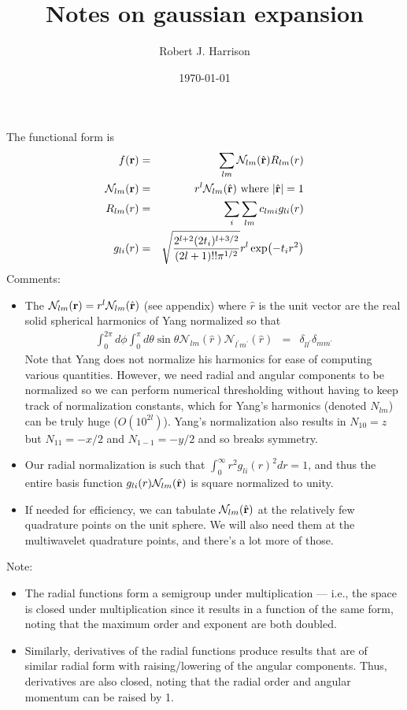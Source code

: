 \documentclass[12pt]{article}
\title{Notes on gaussian expansion}
\date{\today}
\author{Robert J. Harrison}
\newcommand{\N}{\mathcal{N}}
\begin{document}
\maketitle

The functional form is
\begin{eqnarray}
  f(\vb{r}) & = & \sum_{l m} \N_{lm}(\hat{\vb{r}}) R_{lm}(r) \\
  \N_{lm}(\vb{r}) & = &  r^l \N_{lm}(\hat{\vb{r}}) ~ \mbox{where} ~ |\hat{\vb{r}}| = 1 \\
  R_{lm}(r) & = & \sum_i \sum_{l m} c_{lmi} g_{li}(r) \\
  g_{li}(r) & = & \sqrt{\frac{2^{l + 2} (2t_i)^{l + 3/2}}{(2 l + 1)!! \pi^{1/2}}} r^l \exp(-t_i r^2) 
\end{eqnarray}
Comments:
\begin{itemize}
\item The $\N_{lm}(\vb{r}) = r^l \N_{lm}(\hat{\vb{r}})$ (see appendix) where $\hat{r}$ is the unit vector are the real solid spherical harmonics of Yang normalized so that
\begin{eqnarray}
  \int_0^{2 \pi} d\phi \int_0^\pi d\theta \sin \theta  \N_{lm} (\hat{r}) \N_{l^\prime m^\prime}(\hat{r})  & = & \delta_{l l^\prime} \delta_{m m^\prime}
\end{eqnarray}
Note that Yang does not normalize his harmonics for ease of computing various quantities.  However, we need radial and angular components to be normalized so we can perform numerical thresholding without having to keep track of normalization constants, which for Yang's harmonics (denoted $N_{lm}$)  can be truly huge ($O(10^{2l})$).  Yang's normalization also results in $N_{10}=z$ but $N_{11}=-x/2$ and $N_{1-1}=-y/2$ and so breaks symmetry.
\item Our radial normalization is such that $\int_0^\infty r^2 g_{li}(r)^2 dr = 1$, and thus the entire basis function $g_{li}(r) \N_{lm}(\hat{\vb{r}})$ is square normalized to unity.
\item If needed for efficiency, we can tabulate $\N_{lm}(\hat{\vb{r}})$ at the relatively few quadrature points on the unit sphere.  We will also need them at the multiwavelet quadrature points, and there's a lot more of those.
\end{itemize}

Note:
\begin{itemize}
\item The radial functions form a semigroup under multiplication --- i.e., the space is closed under multiplication since it results in a function of the same form, noting that the maximum order and exponent are both doubled.
\item Similarly, derivatives of the radial functions produce results that are of similar radial form with raising/lowering of the angular components.  Thus, derivatives are also closed, noting that the radial order and angular momentum can be raised by 1.
\end{itemize}
\end{document}
